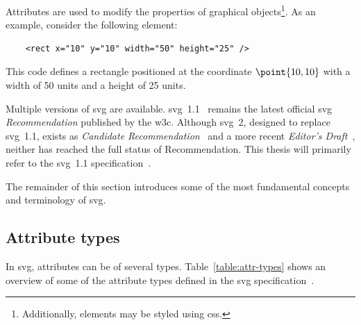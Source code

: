 Attributes are used to modify the properties of graphical objects\footnote{Additionally, elements may be styled using \gls{css}.}. As an example, consider the following element:
\begin{verbatim}
    <rect x="10" y="10" width="50" height="25" />
\end{verbatim}
This code defines a rectangle positioned at the coordinate $\point{10, 10}$ with a width of 50 units and a height of 25 units.

Multiple versions of \gls{svg} are available. \gls{svg}~1.1~\cite{svg11} remains the latest official \gls{svg} \emph{Recommendation} published by the \gls{w3c}. Although \gls{svg}~2, designed to replace \gls{svg}~1.1, exists as \emph{Candidate Recommendation}~\cite{svg2} and a more recent \emph{Editor's Draft}~\cite{svg2-draft}, neither has reached the full status of Recommendation. This thesis will primarily refer to the \gls{svg}~1.1 specification~\cite{svg11}.

The remainder of this section introduces some of the most fundamental concepts and terminology of \gls{svg}.

\subsection{Attribute types}

In \gls{svg}, attributes can be of several types. Table~\ref{table:attr-types} shows an overview of some of the attribute types defined in the \gls{svg} specification~\cite{svg11}.

